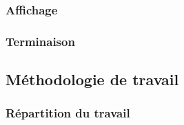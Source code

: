 \documentclass[11pt, a4paper]{article}
\begin{document}
\subsubsection{Affichage}

\subsubsection{Terminaison}

\newpage

\subsection{Méthodologie de travail}
\subsubsection{Répartition du travail}

\newpage
\end{document}

